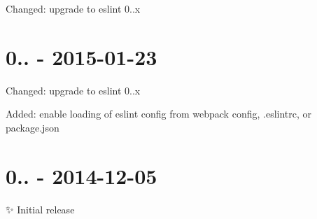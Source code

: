 \begin{DoxyItemize}
\item Changed\+: upgrade to eslint 0..\+x
\end{DoxyItemize}

\section*{0.. -\/ 2015-\/01-\/23}


\begin{DoxyItemize}
\item Changed\+: upgrade to eslint 0..\+x
\item Added\+: enable loading of eslint config from webpack config, {\ttfamily .eslintrc}, or {\ttfamily package.\+json}
\end{DoxyItemize}

\section*{0.. -\/ 2014-\/12-\/05}

✨ Initial release 